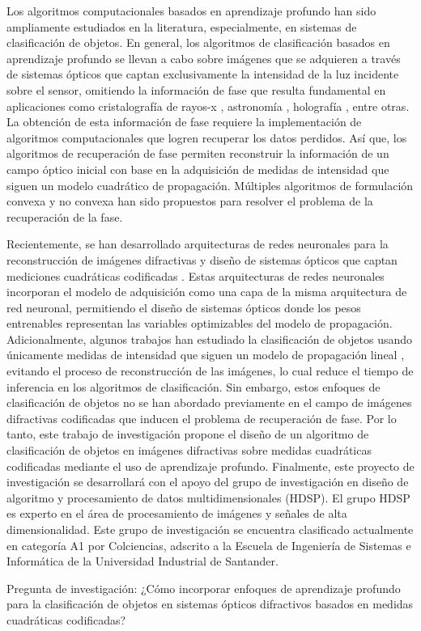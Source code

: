 Los algoritmos computacionales basados en aprendizaje profundo han sido ampliamente estudiados en la literatura, especialmente, en sistemas de clasificación de objetos\cite{li2019deep,li2018deep, wang2019development}. En general, los algoritmos de clasificación basados en aprendizaje profundo se llevan a cabo sobre imágenes que se adquieren a través de sistemas ópticos que captan exclusivamente la intensidad de la luz incidente sobre el sensor, omitiendo la información de fase que resulta fundamental en aplicaciones como cristalografía de rayos-x \cite{pinilla2018coded}, astronomía \cite{fienup1987phase}, holografía \cite{rivenson2018phase}, entre otras. La obtención de esta información de fase requiere la implementación de algoritmos computacionales que logren recuperar los datos perdidos. Así que, los algoritmos de recuperación de fase permiten reconstruir la información de un campo óptico inicial con base en la adquisición de medidas de intensidad que siguen un modelo cuadrático de propagación. Múltiples algoritmos de formulación convexa \cite{candes2013phaselift,goldstein2018phasemax} y no convexa \cite{candes2015phase,chen2017solving,wang2017solving,wang2018phase} han sido propuestos para resolver el problema de la recuperación de la fase.

Recientemente, se han desarrollado arquitecturas de redes neuronales para la reconstrucción de imágenes difractivas y diseño de sistemas ópticos que captan mediciones cuadráticas codificadas \cite{cai2020learning}. Estas arquitecturas de redes neuronales incorporan el modelo de adquisición como una capa de la misma arquitectura de red neuronal, permitiendo el diseño de sistemas ópticos donde los pesos entrenables representan las variables optimizables del modelo de propagación. Adicionalmente, algunos trabajos han estudiado la clasificación de objetos usando únicamente medidas de intensidad que siguen un modelo de propagación lineal \cite{bacca2021deep,douarre2020value}, evitando el proceso de reconstrucción de las imágenes, lo cual reduce el tiempo de inferencia en los algoritmos de clasificación. Sin embargo, estos enfoques de clasificación de objetos no se han abordado previamente en el campo de imágenes difractivas codificadas que inducen el problema de recuperación de fase. Por lo tanto, este trabajo de investigación propone el diseño de un algoritmo de clasificación de objetos en imágenes difractivas sobre medidas cuadráticas codificadas mediante el uso de aprendizaje profundo. Finalmente, este proyecto de investigación se desarrollará con el apoyo del grupo de investigación en diseño de algoritmo y procesamiento de datos multidimensionales (HDSP). El grupo HDSP es experto en el área de procesamiento de imágenes y señales de alta dimensionalidad. Este grupo de investigación se encuentra clasificado actualmente en categoría A1 por Colciencias, adscrito a la Escuela de Ingeniería de Sistemas e Informática de la Universidad Industrial de Santander. 

Pregunta de investigación: ¿Cómo incorporar enfoques de aprendizaje profundo para la clasificación de objetos en sistemas ópticos difractivos basados en medidas cuadráticas codificadas?

\pagebreak